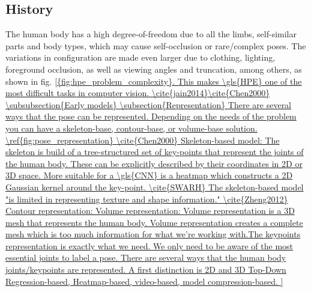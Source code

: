 \subsection{History}
The human body has a high degree-of-freedom due to all the limbs, self-similar parts and body types, which may cause self-occlusion or rare/complex poses.
The variations in configuration are made even larger due to clothing, lighting, foreground occlusion, as well as viewing angles and truncation, among others, as shown in fig. \ref{{fig:hpe_problem_complexity}.
This makes \gls{HPE} one of the most difficult tasks in computer vision. \cite{jain2014}\cite{Chen2000}

\subsubsection{Early models}

\subsection{Representation}

There are several ways that the pose can be represented.
Depending on the needs of the problem you can have a skeleton-base, contour-base, or volume-base solution. \ref{fig:pose_representation} \cite{Chen2000}

Skeleton-based model:
The skeleton is build of a tree-structured set of key-points that represent the joints of the human body.
These can be explicitly described by their coordinates in 2D or 3D space.
More suitable for a \gls{CNN} is a heatmap which constructs a 2D Gaussian kernel around the key-point. \cite{SWARH}

The skeleton-based model "is limited in representing texture and shape information." \cite{Zheng2012}

Contour representation:


Volume representation:
Volume representation is a 3D mesh that represents the human body.


Volume representation creates a complete mesh which is too much information for what we’re working with.​
The keypoints representation is exactly what we need.

We only need to be aware of the most essential joints to label a pose.


There are several ways that the human body joints/keypoints are represented.
A first distinction is 2D and 3D

Top-Down
Regression-based, Heatmap-based, video-based, model compression-based.

}

